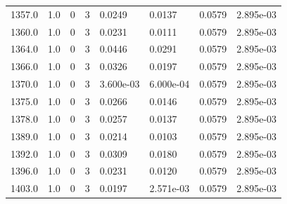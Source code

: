 \documentclass[preview]{standalone}
\begin{document}
{{{{{{{{{\begin{tabular}{L{1.2cm}C{1.2cm} C{0.3cm}C{0.5cm} C{1.4cm}C{1.4cm} C{1.4cm}C{1.4cm}}
  1357.0  &   1.0  & 0     &  3 &  0.0249  & 0.0137  & 0.0579 &  2.895e-03   \\ 
  1360.0  &   1.0  & 0     &  3 &  0.0231  & 0.0111  & 0.0579 &  2.895e-03   \\ 
  1364.0  &   1.0  & 0     &  3 &  0.0446  & 0.0291  & 0.0579 &  2.895e-03   \\ 
  1366.0  &   1.0  & 0     &  3 &  0.0326  & 0.0197  & 0.0579 &  2.895e-03   \\ 
  1370.0  &   1.0  & 0     &  3 &  3.600e-03  & 6.000e-04  & 0.0579 &  2.895e-03   \\ 
  1375.0  &   1.0  & 0     &  3 &  0.0266  & 0.0146  & 0.0579 &  2.895e-03   \\ 
  1378.0  &   1.0  & 0     &  3 &  0.0257  & 0.0137  & 0.0579 &  2.895e-03   \\ 
  1389.0  &   1.0  & 0     &  3 &  0.0214  & 0.0103  & 0.0579 &  2.895e-03   \\ 
  1392.0  &   1.0  & 0     &  3 &  0.0309  & 0.0180  & 0.0579 &  2.895e-03   \\ 
  1396.0  &   1.0  & 0     &  3 &  0.0231  & 0.0120  & 0.0579 &  2.895e-03   \\ 
  1403.0  &   1.0  & 0     &  3 &  0.0197  & 2.571e-03  & 0.0579 &  2.895e-03   \\ 
\hline 
\end{tabular} 

}}}}}}}}}
\end{document}
